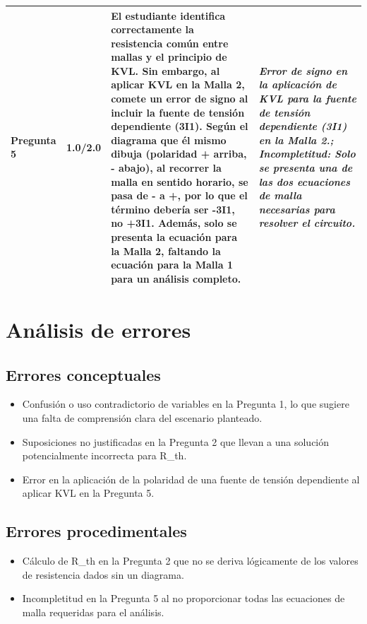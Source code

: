 \documentclass[11pt,a4paper]{article}
\begin{document}
\begin{longtable}{>{\bfseries}p{2.8cm} p{1.6cm} p{7.0cm} p{2.8cm}}
    \midrule
    \textbf{Pregunta 5} & 1.0/2.0 & El estudiante identifica correctamente la resistencia común entre mallas y el principio de KVL. Sin embargo, al aplicar KVL en la Malla 2, comete un error de signo al incluir la fuente de tensión dependiente (3I1). Según el diagrama que él mismo dibuja (polaridad + arriba, - abajo), al recorrer la malla en sentido horario, se pasa de - a +, por lo que el término debería ser -3I1, no +3I1. Además, solo se presenta la ecuación para la Malla 2, faltando la ecuación para la Malla 1 para un análisis completo. & \textit{Error de signo en la aplicación de KVL para la fuente de tensión dependiente (3I1) en la Malla 2.; Incompletitud: Solo se presenta una de las dos ecuaciones de malla necesarias para resolver el circuito.} \\
    \midrule
\end{longtable}

\section*{Análisis de errores}

\subsection*{Errores conceptuales}
\begin{itemize}[leftmargin=1.5em, itemsep=2pt]
  \item Confusión o uso contradictorio de variables en la Pregunta 1, lo que sugiere una falta de comprensión clara del escenario planteado.
  \item Suposiciones no justificadas en la Pregunta 2 que llevan a una solución potencialmente incorrecta para R\_th.
  \item Error en la aplicación de la polaridad de una fuente de tensión dependiente al aplicar KVL en la Pregunta 5.
\end{itemize}

\subsection*{Errores procedimentales}
\begin{itemize}[leftmargin=1.5em, itemsep=2pt]
  \item Cálculo de R\_th en la Pregunta 2 que no se deriva lógicamente de los valores de resistencia dados sin un diagrama.
  \item Incompletitud en la Pregunta 5 al no proporcionar todas las ecuaciones de malla requeridas para el análisis.
\end{itemize}
\end{document}
